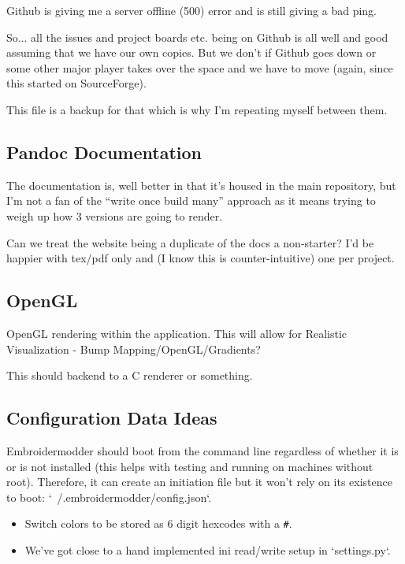 Github is giving me a server offline (500) error and is still giving a bad ping.

So... all the issues and project boards etc. being on Github is all well and good assuming that we have our own copies. But we don't if Github goes down or some other major player takes over the space and we have to move (again, since this started on SourceForge).

This file is a backup for that which is why I'm repeating myself between them.

\subsection{Pandoc Documentation}

The documentation is, well better in that it's housed in the main repository,
but I'm not a fan of the ``write once build many'' approach as it means
trying to weigh up how 3 versions are going to render.

Can we treat the website being a duplicate of the docs a non-starter?
I'd be happier with tex/pdf only and (I know this is counter-intuitive) one
per project.

\subsection{OpenGL}

OpenGL rendering within the application. This will allow for
Realistic Visualization - Bump Mapping/OpenGL/Gradients?

This should backend to a C renderer or something.

\subsection{Configuration Data Ideas}

Embroidermodder should boot from the command line
regardless of whether it is or is not installed (this helps with testing and
running on machines without root). Therefore, it can create an initiation file
but it won't rely on its existence to boot: `~/.embroidermodder/config.json`.

\begin{itemize}
\item Switch colors to be stored as 6 digit hexcodes with a \texttt{\#}.
\item We've got close to a hand implemented ini read/write setup in `settings.py`.
\end{itemize}

